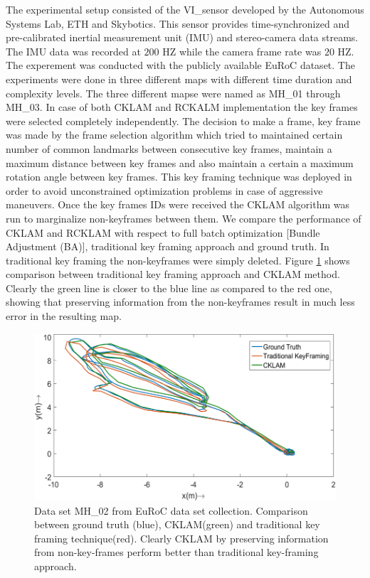 The experimental setup consisted of the VI\_sensor \cite{6906892} developed by the Autonomous Systems Lab, ETH and Skybotics. This sensor provides time-synchronized and pre-calibrated inertial measurement unit (IMU) and stereo-camera data streams. The IMU data was recorded at $200$ HZ while the camera frame rate was $20$ HZ. The experement was conducted with the publicly available EuRoC \cite{Burri25012016} dataset. The experiments were done in three different maps with different time duration and complexity levels. The three different mapse were named as MH\_01 through MH\_03. In case of both CKLAM and RCKALM implementation the key frames were selected completely independently. The decision to make a frame, key frame was made by the frame selection algorithm which tried to maintained certain number of common landmarks between consecutive key frames, maintain a maximum distance between key frames and also maintain a certain a maximum rotation angle between key frames. This key framing technique was deployed in order to avoid unconstrained optimization problems in case of aggressive maneuvers. Once the key frames IDs were received the CKLAM algorithm was run to marginalize non-keyframes between them. We compare the performance of CKLAM and RCKLAM with respect to full batch optimization [Bundle Adjustment (BA)], traditional key framing approach and ground truth. In traditional key framing the non-keyframes were simply deleted. Figure \ref{fig:CKLAMvsGT} shows comparison between traditional key framing approach and CKLAM method. Clearly the green line is closer to the blue line as compared to the red one, showing that preserving information from the non-keyframes result in much less error in the resulting map.

\begin{figure}
	\centering
		\includegraphics[width=1.00\textwidth]{images/CKLAMvsGT.png}
  \caption{Data set MH\_02 from EuRoC \cite{Burri25012016} data set collection. Comparison between ground truth (blue), CKLAM(green) and traditional key framing technique(red). Clearly CKLAM by preserving information from non-key-frames perform better than traditional key-framing approach.}
  \label{fig:CKLAMvsGT}
\end{figure}

